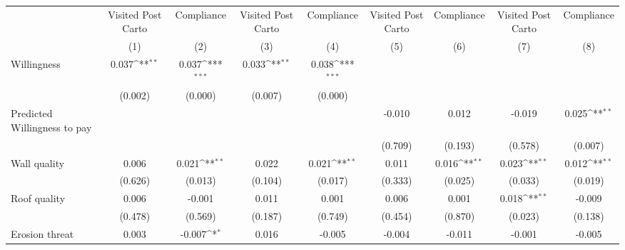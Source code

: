 {
\def\sym#1{\ifmmode^{#1}\else\(^{#1}\)\fi}
\begin{tabular}{l*{8}{c}}
\toprule
                &\multicolumn{1}{c}{Visited Post Carto}&\multicolumn{1}{c}{Compliance}&\multicolumn{1}{c}{Visited Post Carto}&\multicolumn{1}{c}{Compliance}&\multicolumn{1}{c}{Visited Post Carto}&\multicolumn{1}{c}{Compliance}&\multicolumn{1}{c}{Visited Post Carto}&\multicolumn{1}{c}{Compliance}\\
                &\multicolumn{1}{c}{(1)}         &\multicolumn{1}{c}{(2)}         &\multicolumn{1}{c}{(3)}         &\multicolumn{1}{c}{(4)}         &\multicolumn{1}{c}{(5)}         &\multicolumn{1}{c}{(6)}         &\multicolumn{1}{c}{(7)}         &\multicolumn{1}{c}{(8)}         \\
\midrule
Willingness     &    0.037\sym{**} &    0.037\sym{***}&    0.033\sym{**} &    0.038\sym{***}&                  &                  &                  &                  \\
                &  (0.002)         &  (0.000)         &  (0.007)         &  (0.000)         &                  &                  &                  &                  \\
Predicted Willingness to pay&                  &                  &                  &                  &   -0.010         &    0.012         &   -0.019         &    0.025\sym{**} \\
                &                  &                  &                  &                  &  (0.709)         &  (0.193)         &  (0.578)         &  (0.007)         \\
Wall quality    &    0.006         &    0.021\sym{**} &    0.022         &    0.021\sym{**} &    0.011         &    0.016\sym{**} &    0.023\sym{**} &    0.012\sym{**} \\
                &  (0.626)         &  (0.013)         &  (0.104)         &  (0.017)         &  (0.333)         &  (0.025)         &  (0.033)         &  (0.019)         \\
Roof quality    &    0.006         &   -0.001         &    0.011         &    0.001         &    0.006         &    0.001         &    0.018\sym{**} &   -0.009         \\
                &  (0.478)         &  (0.569)         &  (0.187)         &  (0.749)         &  (0.454)         &  (0.870)         &  (0.023)         &  (0.138)         \\
Erosion threat  &    0.003         &   -0.007\sym{*}  &    0.016         &   -0.005         &   -0.004         &   -0.011         &   -0.001         &   -0.005         \\

\end{tabular}}
